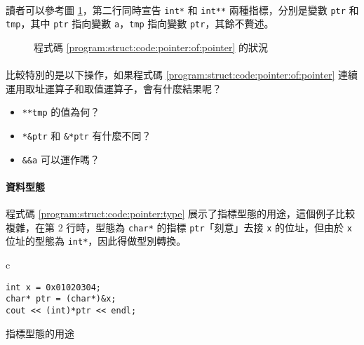 \documentclass[12pt,a4paper,oneside]{article}
\begin{document}
\begin{CJK}{UTF8}{bkai}
\paragraph{}讀者可以參考圖 \ref{program:struct:fig:pointer:of:pointer}，第二行同時宣告 \lstinline!int*! 和 \lstinline!int**! 兩種指標，分別是變數 \lstinline!ptr! 和 \lstinline!tmp!，其中 \lstinline!ptr! 指向變數 \lstinline!a!，\lstinline!tmp! 指向變數 \lstinline!ptr!，其餘不贅述。

\begin{figure}[h!]
\centering
{}
\caption{程式碼 \ref{program:struct:code:pointer:of:pointer} 的狀況}
\label{program:struct:fig:pointer:of:pointer}
\end{figure}

\paragraph{}比較特別的是以下操作，如果程式碼 \ref{program:struct:code:pointer:of:pointer} 連續運用取址運算子和取值運算子，會有什麼結果呢？
\begin{itemize}
\item \lstinline!**tmp! 的值為何？
\item \lstinline!*&ptr! 和 \lstinline!&*ptr! 有什麼不同？
\item \lstinline!&&a! 可以運作嗎？
\end{itemize}

\paragraph{資料型態}程式碼 \ref{program:struct:code:pointer:type} 展示了指標型態的用途，這個例子比較複雜，在第 2 行時，型態為 \lstinline!char*! 的指標 \lstinline!ptr!「刻意」去接 \lstinline!x! 的位址，但由於 \lstinline!x! 位址的型態為 \lstinline!int*!，因此得做型別轉換。

\begin{code}[h!]
\centering
\begin{tabular}{c}
\begin{lstlisting}
int x = 0x01020304;
char* ptr = (char*)&x;
cout << (int)*ptr << endl;
\end{lstlisting}
\end{tabular}
\caption{指標型態的用途}
\label{program:struct:code:pointer:type}
\end{code}


\end{CJK}
\end{document}
